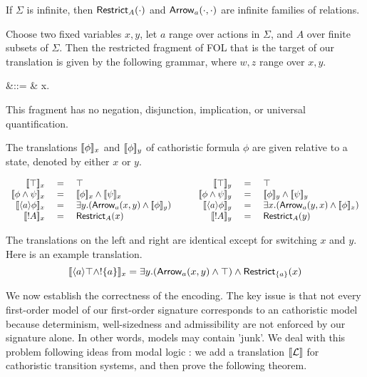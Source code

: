 \NI If $\Sigma$ is infinite, then $\mathsf{Restrict}_{A}(\cdot)$ and
$\mathsf{Arrow}_{a}(\cdot, \cdot)$ are infinite families of relations.

\begin{definition}
 Choose two fixed variables $x, y$, let $a$ range over actions in
$\Sigma$, and $A$ over finite subsets of $\Sigma$. Then the restricted
fragment of FOL that is the target of our translation is given by the
following grammar, where $w, z$ range over $x, y$.

\begin{GRAMMAR}
  \phi 
     &\quad ::= \quad&
  \top \fOr {}\fOr {} \fOr \phi \AND \psi \fOr \exists x. \phi 
\end{GRAMMAR}

\end{definition}

\NI This fragment has no negation, disjunction, implication, or
universal quantification.

\begin{definition}
The translations $\lbrack\!\lbrack \phi \rbrack\!\rbrack_x$ and $\lbrack\!\lbrack \phi \rbrack\!\rbrack_y$ of cathoristic formula 
$\phi$ are given relative to a state, denoted by either $x$ or $y$.

\[
\begin{array}{rclcrcl}
  \SEMB{\top}_x & \ = \ & \top  
     &\quad& 
  \SEMB{\top}_y & \ = \ & \top 
     \\
  \SEMB{\phi \AND \psi}_x & = & \SEMB{\phi}_x \AND \SEMB{\psi}_x  
     && 
  \SEMB{\phi \AND \psi}_y & = & \SEMB{\phi}_y \AND \SEMB{\psi}_y  
     \\
  \SEMB{\langle a \rangle \phi}_x & = & \exists y.(\ARROW{a}{x}{y} \AND \SEMB{\phi}_y)  
     &&
  \SEMB{\langle a \rangle \phi}_y & = & \exists x.(\ARROW{a}{y}{x} \AND \SEMB{\phi}_x)  
     \\
  \SEMB{\fBang A}_x & = & \RESTRICT{A}{x}
     &&
  \SEMB{\fBang A}_y & = & \RESTRICT{A}{y}
\end{array}
\]

\end{definition}

\NI The translations on the left and right are identical except for
switching $x$ and $y$. Here is an example translation.
\[
   \lbrack\!\lbrack \langle a \rangle \top \land ! \{a\} \rbrack\!\rbrack_x 
      = 
   \exists y.(\mathsf{Arrow}_{a}(x, y) \land \top ) \land \mathsf{Restrict}_{\{a\}}(x)
\]

\NI We now establish the correctness of the encoding. The key issue is
that not every first-order model of our first-order signature
corresponds to an cathoristic model because determinism, well-sizedness and
admissibility are not enforced by our signature alone. In other words,
models may contain 'junk'.  We deal with this problem following ideas
from modal logic \cite{BlackburnP:modlog}: we add a translation
$\lbrack\!\lbrack \mathcal{L} \rbrack\!\rbrack$ for cathoristic transition systems, and then prove the
following theorem.

